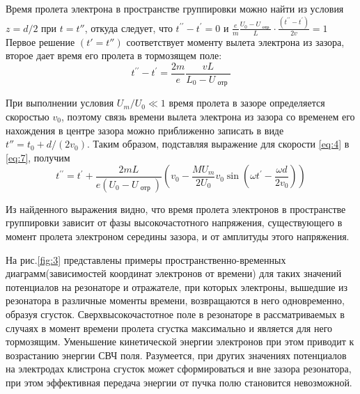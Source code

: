 Время пролета электрона в пространстве группировки можно найти из условия $z = d / 2$ при $t=t''$, откуда следует, что 
$t ^ { \prime \prime } - t ^ { \prime } = 0$ и 
$\frac { e } { m } \frac { U _ { 0 } - U _ { \text { отр } } } { L }\cdot \frac { \left( t ^ { \prime \prime } - t ^ { \prime } \right) } { 2 v } = 1$
Первое решение $(t' = t'' )$ соответствует моменту вылета электрона из зазора, второе дает время его пролета в тормозящем поле:
\begin{equation}
	t ^ { \prime \prime } - t ^ { \prime } = \frac { 2 m } { e } \frac { v L } { L _ { 0 } - U _ { \text { отр } } }
	\label{eq:7}
\end{equation}

При выполнении условия $U_{ m } / U _{ 0 } \ll 1$ время пролета в зазоре определяется скоростью $v_0$, поэтому связь времени вылета электрона из зазора со временем его нахождения в центре зазора можно приближенно записать в виде
$t'' = t _ { 0 } + d / \left( 2 v _ { 0 } \right)$. Таким образом, подставляя выражение для скорости \eqref{eq:4} в \eqref{eq:7}, получим
\begin{equation}
	t ^ { \prime \prime } = t ^ { \prime } + \frac { 2 m L } { e \left( U _ { 0 } - U _ { \text { отр } } \right) } \left( v _ { 0 } - \frac { M U _ { m } } { 2 U _ { 0 } } v _ { 0 } \sin \left( \omega t ^ { \prime } - \frac { \omega d } { 2 v _ { 0 } } \right) \right)
	\label{eq:8}
\end{equation}

Из найденного выражения видно, что время пролета электронов в пространстве группировки зависит от фазы высокочастотного напряжения, существующего в момент пролета электроном середины зазора, и от амплитуды этого напряжения.

На рис.\ref{fig:3} представлены примеры пространственно-временных диаграмм(зависимостей координат электронов от времени) для таких значений потенциалов на резонаторе и отражателе, при которых электроны, вышедшие из резонатора в различные моменты времени, возвращаются в него одновремен­но, образуя сгусток. Сверхвысокочастотное поле в резонаторе в рассматриваемых в случаях в момент времени пролета сгустка максимально и является для него тормозящим. Уменьшение кинетической энергии электронов при этом приводит к возрастанию энергии СВЧ поля. Разумеется, при других значениях потенциалов на электродах клистрона сгусток может сформироваться и вне зазора резонатора, при этом эффективная передача энергии от пучка полю становится невозможной.


